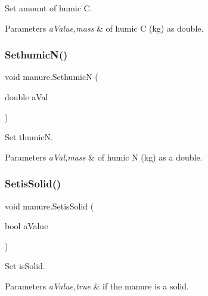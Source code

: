 Set amount of humic C. 


\begin{DoxyParams}{Parameters}
{\em a\+Value,mass} & of humic C (kg) as double. \\
\hline
\end{DoxyParams}
\mbox{\label{classmanure_a1f1fbd38710b993c9577049b2df3f51b}} 
\subsubsection{\texorpdfstring{SethumicN()}{SethumicN()}}
{\footnotesize\ttfamily void manure.\+SethumicN (\begin{DoxyParamCaption}\item[{double}]{a\+Val }\end{DoxyParamCaption})\hspace{0.3cm}{\ttfamily [inline]}}



Set thumicN. 


\begin{DoxyParams}{Parameters}
{\em a\+Val,mass} & of humic N (kg) as a double. \\
\hline
\end{DoxyParams}
\mbox{\label{classmanure_ab68f8bc5fee94481bf040a4f7df91fdb}} 
\subsubsection{\texorpdfstring{SetisSolid()}{SetisSolid()}}
{\footnotesize\ttfamily void manure.\+Setis\+Solid (\begin{DoxyParamCaption}\item[{bool}]{a\+Value }\end{DoxyParamCaption})\hspace{0.3cm}{\ttfamily [inline]}}



Set is\+Solid. 


\begin{DoxyParams}{Parameters}
{\em a\+Value,true} & if the manure is a solid. \\
\hline
\end{DoxyParams}
\mbox{\label{classmanure_af68a19d92a62f06032c80514e66d3b68}} 

